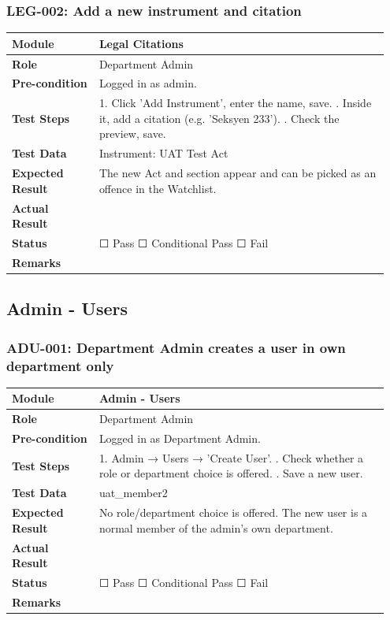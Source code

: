 \documentclass[10pt]{article}
\begin{document}
\subsubsection*{LEG-002: Add a new instrument and citation}
\begin{longtable}{p{0.22\linewidth}p{0.73\linewidth}}
\hline
\textbf{Module} & Legal Citations \\ \hline
\textbf{Role} & Department Admin \\ \hline
\textbf{Pre-condition} & Logged in as admin. \\ \hline
\textbf{Test Steps} & 1. Click 'Add Instrument', enter the name, save. \newline 2. Inside it, add a citation (e.g. 'Seksyen 233'). \newline 3. Check the preview, save. \\ \hline
\textbf{Test Data} & Instrument: UAT Test Act \\ \hline
\textbf{Expected Result} & The new Act and section appear and can be picked as an offence in the Watchlist. \\ \hline
\textbf{Actual Result} & \newline \newline \\ \hline
\textbf{Status} & ☐ Pass \quad ☐ Conditional Pass \quad ☐ Fail \\ \hline
\textbf{Remarks} & \newline \\ \hline
\end{longtable}
\subsection{Admin - Users}
\subsubsection*{ADU-001: Department Admin creates a user in own department only}
\begin{longtable}{p{0.22\linewidth}p{0.73\linewidth}}
\hline
\textbf{Module} & Admin - Users \\ \hline
\textbf{Role} & Department Admin \\ \hline
\textbf{Pre-condition} & Logged in as Department Admin. \\ \hline
\textbf{Test Steps} & 1. Admin → Users → 'Create User'. \newline 2. Check whether a role or department choice is offered. \newline 3. Save a new user. \\ \hline
\textbf{Test Data} & uat\_member2 \\ \hline
\textbf{Expected Result} & No role/department choice is offered. The new user is a normal member of the admin's own department. \\ \hline
\textbf{Actual Result} & \newline \newline \\ \hline
\textbf{Status} & ☐ Pass \quad ☐ Conditional Pass \quad ☐ Fail \\ \hline
\textbf{Remarks} & \newline \\ \hline
\end{longtable}
\end{document}

